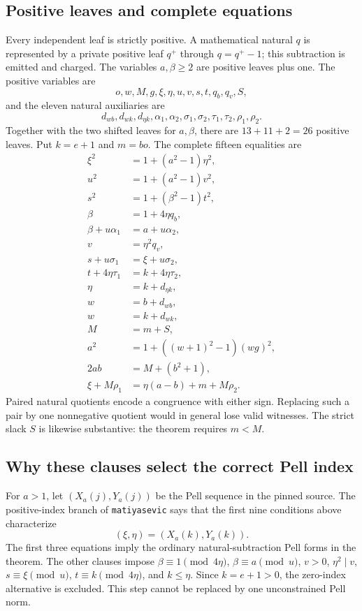 \documentclass[11pt,letterpaper]{article}
\theoremstyle{definition}
\theoremstyle{remark}
\begin{document}
\subsection{Positive leaves and complete equations}
Every independent leaf is strictly positive. A mathematical natural $q$ is represented by a private positive leaf $q^+$ through $q=q^+-1$; this subtraction is emitted and charged. The variables $a,\beta\ge2$ are positive leaves plus one. The positive variables are
\[
 o,w,M,g,\xi,\eta,u,v,s,t,q_b,q_v,S,
\]
and the eleven natural auxiliaries are
\[
 d_{wb},d_{wk},d_{\eta k},\alpha_1,\alpha_2,\sigma_1,\sigma_2,
 \tau_1,\tau_2,\rho_1,\rho_2.
\]
Together with the two shifted leaves for $a,\beta$, there are $13+11+2=26$ positive leaves. Put $k=e+1$ and $m=bo$. The complete fifteen equalities are
\begin{align}
 \xi^2&=1+(a^2-1)\eta^2,\label{gts:cm:eq:p1}\\
 u^2&=1+(a^2-1)v^2,\label{gts:cm:eq:p2}\\
 s^2&=1+(\beta^2-1)t^2,\label{gts:cm:eq:p3}\\
 \beta&=1+4\eta q_b,\label{gts:cm:eq:p4}\\
 \beta+u\alpha_1&=a+u\alpha_2,\label{gts:cm:eq:p5}\\
 v&=\eta^2q_v,\label{gts:cm:eq:p6}\\
 s+u\sigma_1&=\xi+u\sigma_2,\label{gts:cm:eq:p7}\\
 t+4\eta\tau_1&=k+4\eta\tau_2,\label{gts:cm:eq:p8}\\
 \eta&=k+d_{\eta k},\label{gts:cm:eq:p9}\\
 w&=b+d_{wb},\label{gts:cm:eq:p10}\\
 w&=k+d_{wk},\label{gts:cm:eq:p11}\\
 M&=m+S,\label{gts:cm:eq:p12}\\
 a^2&=1+((w+1)^2-1)(wg)^2,\label{gts:cm:eq:p13}\\
 2ab&=M+(b^2+1),\label{gts:cm:eq:p14}\\
 \xi+M\rho_1&=\eta(a-b)+m+M\rho_2.\label{gts:cm:eq:p15}
\end{align}
Paired natural quotients encode a congruence with either sign. Replacing such a pair by one nonnegative quotient would in general lose valid witnesses. The strict slack $S$ is likewise substantive: the theorem requires $m<M$.

\subsection{Why these clauses select the correct Pell index}
For $a>1$, let $(X_a(j),Y_a(j))$ be the Pell sequence in the pinned source. The positive-index branch of \texttt{matiyasevic} says that the first nine conditions above characterize
\[
 (\xi,\eta)=(X_a(k),Y_a(k)).
\]
The first three equations imply the ordinary natural-subtraction Pell forms in the theorem. The other clauses impose $\beta\equiv1\pmod{4\eta}$, $\beta\equiv a\pmod u$, $v>0$, $\eta^2\mid v$, $s\equiv\xi\pmod u$, $t\equiv k\pmod{4\eta}$, and $k\le\eta$. Since $k=e+1>0$, the zero-index alternative is excluded. This step cannot be replaced by one unconstrained Pell norm.
\end{document}
